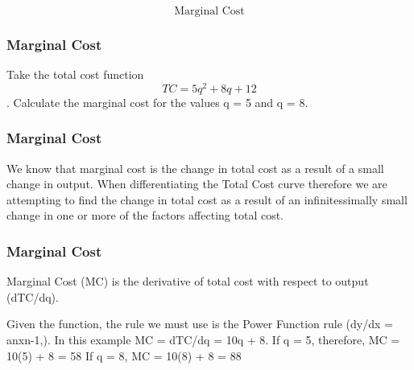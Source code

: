 \documentclass{beamer}
\begin{document}
\begin{frame}
\Large
\[\mbox{Marginal Cost}\]
\end{frame}


\begin{frame}
\frametitle{Marginal Cost}

Take the total cost function \[TC = 5q^2 + 8q + 12\]. Calculate the marginal cost for the values q = 5 and q = 8.
\end{frame}
\begin{frame}
\frametitle{Marginal Cost}
We know that marginal cost is the change in total cost as a result of a small change in output. When differentiating the Total Cost curve therefore we are attempting to find the change in total cost as a result of an infinitessimally small change in one or more of the factors affecting total cost. 
\end{frame}
\begin{frame}
\frametitle{Marginal Cost}
Marginal Cost (MC) is the derivative of total cost with respect to output (dTC/dq). 

Given the function, the rule we must use is the Power Function rule (dy/dx = anxn-1,). In this example MC = dTC/dq = 10q + 8.
If q = 5, therefore, MC = 10(5) + 8 = 58
If q = 8, MC = 10(8) + 8 = 88
\end{frame}
\end{document}
